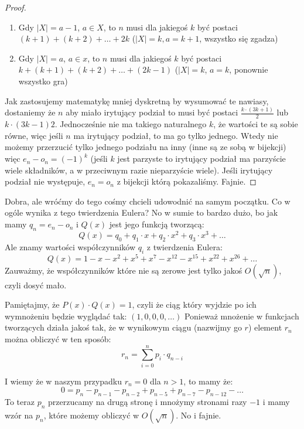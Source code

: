 \begin{proof}
        \begin{enumerate}
            \item Gdy $|X| = a - 1$, $a \in X$, to $n$ musi dla jakiegoś $k$ być postaci $(k + 1) + (k + 2) + \dots + 2k $ ($|X| =k, a = k+1$, wszystko się zgadza)
            \item Gdy $|X| = a$, $a \in x$, to $n$ musi dla jakiegoś $k$ być postaci $k + (k+1) + (k+2) + \dots + (2k - 1)$ ($|X| = k$, $a = k$, ponownie wszystko gra)
        \end{enumerate}

        Jak zastosujemy matematykę mniej dyskretną by wysumować te nawiasy, dostaniemy że $n$ aby miało irytujący podział to musi być postaci $\frac{k \cdot (3k+1)}{2}$ lub ${k \cdot (3k-1)}{2}$. Jednocześnie nie ma takiego naturalnego $k$, że wartości te są sobie równe, więc jeśli $n$ ma irytujący podział, to ma go tylko jednego. Wtedy nie możemy przerzucić tylko jednego podziału na inny (inne są ze sobą w bijekcji) więc $e_n - o_n = (-1)^k$ (jeśli $k$ jest parzyste to irytujący podział ma parzyście wiele składników, a w przeciwnym razie nieparzyście wiele). Jeśli irytujący podział nie występuje, $e_n = o_n$ z bijekcji którą pokazaliśmy. Fajnie.
\end{proof}
        
    Dobra, ale wróćmy do tego cośmy chcieli udowodnić na samym początku. Co w ogóle wynika z tego twierdzenia Eulera? No w sumie to bardzo dużo, bo jak mamy $q_n = e_n - o_n$ i $Q(x)$ jest jego funkcją tworzącą:
    \begin{equation*}
        Q(x) = q_0 + q_1 \cdot x + q_2 \cdot x^2 + q_3 \cdot x^3 + \dots 
    \end{equation*}
    Ale znamy wartości współczynników $q_i$ z twierdzenia Eulera:
     \begin{equation*}
        Q(x) = 1 - x - x^2 + x^5 + x^7 - x^{12} - x^{15} + x^{22} + x^{26} + \dots
    \end{equation*}
    Zauważmy, że współczynników które nie są zerowe jest tylko jakoś $O(\sqrt{n})$, czyli dosyć mało. 

    Pamiętajmy, że $P(x) \cdot Q(x) = 1$, czyli że ciąg który wyjdzie po ich wymnożeniu będzie wyglądać tak: $(1,0,0,0, \dots)$ Ponieważ mnożenie w funkcjach tworzących działa jakoś tak, że w wynikowym ciągu (nazwijmy go $r$) element $r_n$ można obliczyć w ten sposób: 
    \begin{equation*}
        r_n = \sum_{i=0}^{n} p_i \cdot q_{n-i}
    \end{equation*}

    I wiemy że w naszym przypadku $r_n = 0$ dla $n > 1$, to mamy że: \begin{equation*}
        0 = p_n - p_{n-1} - p_{n-2} + p_{n-5} + p_{n-7} - p_{n-12} - \dots 
    \end{equation*}
    To teraz $p_n$ przerzucamy na drugą stronę i mnożymy stronami razy $-1$ i mamy wzór na $p_n$, które możemy obliczyć w $O(\sqrt{n})$. No i fajnie. 